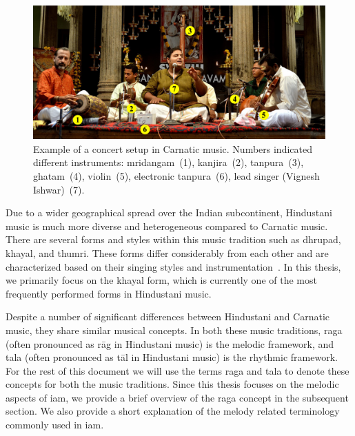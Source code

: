 \begin{figure}
	\begin{center}
		\includegraphics[width=\figSizeHundred]{ch02_background/figures/VigneshConcert.pdf}
	\end{center}
	\caption[Example of a concert setup in Carnatic music]{Example of a concert setup in Carnatic music. Numbers indicated different instruments: \gls{mridangam}~(1), \gls{kanjira}~(2), \gls{tanpura}~(3), \gls{ghatam}~(4), violin~(5), electronic \gls{tanpura}~(6), lead singer (Vignesh Ishwar)~(7).}
	\label{fig:concert_picture}
\end{figure}



Due to a wider geographical spread over the Indian subcontinent, Hindustani music is much more diverse and heterogeneous compared to Carnatic music. There are several forms and styles within this music tradition such as \gls{dhrupad}, \gls{khayal}, and \gls{thumri}. These forms differ considerably from each other and are characterized based on their singing styles and instrumentation~\citep{Bor2010}. In this thesis, we primarily focus on the \gls{khayal} form, which is currently one of the most frequently performed forms in Hindustani music. 

Despite a number of significant differences between Hindustani and Carnatic music, they share similar musical concepts. In both these music traditions, \gls{raga} (often pronounced as r\={a}g in Hindustani music) is the melodic framework, and \gls{tala} (often pronounced as t\={a}l in Hindustani music) is the rhythmic framework. For the rest of this document we will use the terms \gls{raga} and \gls{tala} to denote these concepts for both the music traditions. Since this thesis focuses on the melodic aspects of \gls{iam}, we provide a brief overview of the \gls{raga} concept in the subsequent section. We also provide a short explanation of the melody related terminology commonly used in \gls{iam}. 


